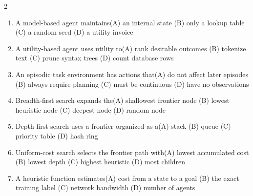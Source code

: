 \documentclass[a4paper]{article}
\begin{document}
\begin{multicols*}{2}
\begin{enumerate}
\item A model-based agent maintains\newline\hspace*{0.6em}(A) an internal state \quad (B) only a lookup table \newline\hspace*{0.6em}(C) a random seed \quad (D) a utility invoice
\item A utility-based agent uses utility to\newline\hspace*{0.6em}(A) rank desirable outcomes \quad (B) tokenize text \newline\hspace*{0.6em}(C) prune syntax trees \quad (D) count database rows
\item An episodic task environment has actions that\newline\hspace*{0.6em}(A) do not affect later episodes \quad (B) always require planning \newline\hspace*{0.6em}(C) must be continuous \quad (D) have no observations
\item Breadth-first search expands the\newline\hspace*{0.6em}(A) shallowest frontier node \quad (B) lowest heuristic node \newline\hspace*{0.6em}(C) deepest node \quad (D) random node
\item Depth-first search uses a frontier organized as a\newline\hspace*{0.6em}(A) stack \quad (B) queue \newline\hspace*{0.6em}(C) priority table \quad (D) hash ring
\item Uniform-cost search selects the frontier path with\newline\hspace*{0.6em}(A) lowest accumulated cost \quad (B) lowest depth \newline\hspace*{0.6em}(C) highest heuristic \quad (D) most children
\item A heuristic function estimates\newline\hspace*{0.6em}(A) cost from a state to a goal \quad (B) the exact training label \newline\hspace*{0.6em}(C) network bandwidth \quad (D) number of agents

\end{enumerate}
\end{multicols*}
\end{document}
